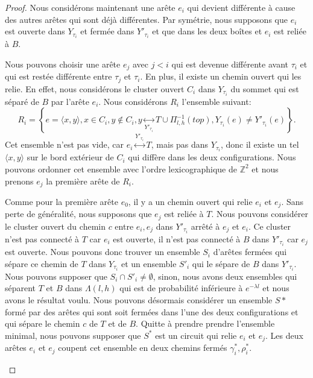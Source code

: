 \documentclass[titlepage,a4paper,12pt]{article}
\begin{document}
\begin{proof}
Nous considérons maintenant une arête $e_i$ qui devient différente à cause des autres arêtes qui sont déjà différentes. Par symétrie, nous supposons que $e_i$ est ouverte dans $Y_{\tau_i}$ et fermée dans $Y'_{\tau_i}$ et que dans les deux boîtes et $e_i$ est reliée à $B$.

Nous pouvons choisir une arête $e_j$ avec $j< i$ qui est devenue différente avant $\tau_i$ et qui est restée différente entre $\tau_j$ et $\tau_i$. En plus, il existe un chemin ouvert qui les relie. En effet, nous considérons le cluster ouvert $C_i$ dans $Y_{\tau_i}$ du sommet qui est séparé de $B$ par l'arête $e_i$. Nous considérons $R_i$ l'ensemble suivant:
$$ R_i = \left\lbrace e = \langle x,y\rangle, x\in C_i, y\notin C_i, y\underset{Y'_{\tau_i}}{\leftrightarrow} T\cup \Pi_{l,h}^{-1}(top), Y_{\tau_i}(e)\neq Y'_{\tau_i}(e) \right\rbrace.
$$
Cet ensemble n'est pas vide, car $e_i\overset{Y'_{\tau_i}}{\leftrightarrow} T$, mais pas dans $Y_{\tau_i}$, donc il existe un tel $\langle x,y\rangle$ sur le bord extérieur de $C_i$ qui diffère dans les deux configurations. Nous pouvons ordonner cet ensemble avec l'ordre lexicographique de $\mathbb{Z}^2$ et nous prenons $e_j$ la première arête de $R_i$.

Comme pour la première arête $e_0$, il y a un chemin ouvert qui relie $e_i$ et $e_j$. Sans perte de généralité, nous supposons que $e_j$ est reliée à $T$.
Nous pouvons considérer le cluster ouvert du chemin $c$ entre $e_i,e_j$ dans $Y'_{\tau_i}$ arrêté à $e_j$ et $e_i$. Ce cluster n'est pas connecté à $T$ car $e_i$ est ouverte, il n'est pas connecté à $B$ dans $Y'_{\tau_i}$ car $e_j$ est ouverte. Nous pouvons donc trouver un ensemble $S_i$ d'arêtes fermées qui sépare ce chemin de $T$ dans $Y_{\tau_i}$ et un ensemble $S'_i$ qui le sépare de $B$ dans $Y'_{\tau_i}$. Nous pouvons supposer que $S_i\cap S'_i \neq \emptyset$, sinon, nous avons deux ensembles qui séparent $T$ et $B$ dans $\Lambda(l,h)$ qui est de probabilité inférieure à $e^{-\lambda l}$ et nous avons le résultat voulu. Nous pouvons désormais considérer un ensemble $S*$ formé par des arêtes qui sont soit fermées dans l'une des deux configurations et qui sépare le chemin $c$ de $T$ et de $B$. Quitte à prendre prendre l'ensemble minimal, nous pouvons supposer que $S^*$ est un circuit qui relie $e_i$ et $e_j$. Les deux arêtes $e_i$ et $e_j$ coupent cet ensemble en deux chemins fermés $\gamma_i^*, \rho_i^*$.
\begin{figure}[h]


\end{figure}
\end{proof}
\end{document}
